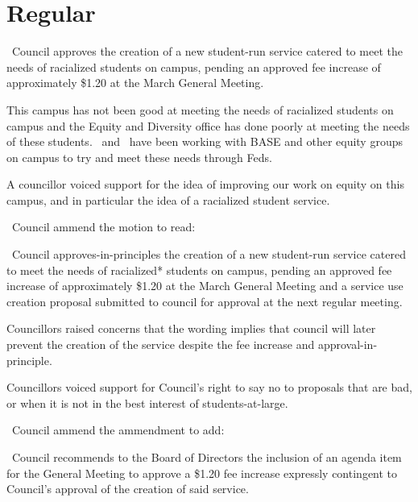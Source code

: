 \section*{Regular}
\begin{motion}
    \birt\ Council approves the creation of a new student-run service
    catered to meet the needs of racialized students on campus, pending an
    approved fee increase of approximately \$1.20 at the March General Meeting.
    \movers{\antonio}{\brian}

    This campus has not been good at meeting the needs of
    racialized students on campus and the Equity and Diversity office has done
    poorly at meeting the needs of these students. \pres\ and \vpsl\ have been
    working with BASE and other equity groups on campus to try and meet these
    needs through Feds. 

    A councillor voiced support for the idea of improving our work on equity 
    on this campus, and in particular the idea of a racialized student 
    service. 

    \begin{motion}
        \birt\ Council ammend the motion to read:

        \begin{motion} 
            \birt\ Council approves-in-principles the creation of a new
            student-run service catered to meet the needs of racialized*
            students on campus, pending an approved fee increase of
            approximately \$1.20 at the March General Meeting and a service use
            creation proposal submitted to council for approval at the next
            regular meeting.
        \end{motion}
        \movers{\seneca}{\jennifer}

        Councillors raised concerns that the wording implies that council will
        later prevent the creation of the service despite the fee increase
        and approval-in-principle. 

        Councillors voiced support for Council's right to say no to proposals
        that are bad, or when it is not in the best interest of
        students-at-large.

        \begin{motion}
            \birt\ Council ammend the ammendment to add: 
            \begin{motion} 

                \bifrt\ Council recommends to the Board of Directors the
                inclusion of an agenda item for the General Meeting to approve
                a \$1.20 fee increase expressly contingent to Council’s
                approval of the creation of said service.


\end{motion}
\end{motion}
\end{motion}
\end{motion}
